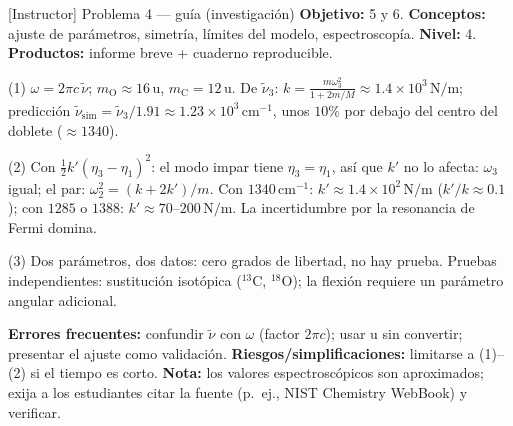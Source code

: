\documentclass[spanish,10pt]{beamer}
\begin{document}
\begin{frame}{[Instructor] Problema 4 — guía (investigación)}
\footnotesize
\textbf{Objetivo:} 5 y 6. \textbf{Conceptos:} ajuste de parámetros, simetría, límites del modelo, espectroscopía. \textbf{Nivel:} 4. \textbf{Productos:} informe breve + cuaderno reproducible.

(1) $\omega=2\pi c\,\tilde\nu$; $m_{\mathrm O}\approx16\,$u, $m_{\mathrm C}=12\,$u. De $\tilde\nu_3$: $k=\frac{m\omega_3^2}{1+2m/M}\approx1.4\times10^3\,\mathrm{N/m}$; predicción $\tilde\nu_{\mathrm{sim}}=\tilde\nu_3/1.91\approx1.23\times10^3\,\mathrm{cm}^{-1}$, unos $10\%$ por debajo del centro del doblete ($\approx1340$).

(2) Con $\frac12k'(\eta_3-\eta_1)^2$: el modo impar tiene $\eta_3=\eta_1$, así que $k'$ no lo afecta: $\omega_3$ igual; el par: $\omega_2^2=(k+2k')/m$. Con $1340\,\mathrm{cm}^{-1}$: $k'\approx1.4\times10^2\,\mathrm{N/m}$ ($k'/k\approx0.1$); con $1285$ o $1388$: $k'\approx70$–$200\,\mathrm{N/m}$. La incertidumbre por la resonancia de Fermi domina.

(3) Dos parámetros, dos datos: cero grados de libertad, no hay prueba. Pruebas independientes: sustitución isotópica ($^{13}$C, $^{18}$O); la flexión requiere un parámetro angular adicional.

\textbf{Errores frecuentes:} confundir $\tilde\nu$ con $\omega$ (factor $2\pi c$); usar u sin convertir; presentar el ajuste como validación. \textbf{Riesgos/simplificaciones:} limitarse a (1)–(2) si el tiempo es corto. \textbf{Nota:} los valores espectroscópicos son aproximados; exija a los estudiantes citar la fuente (p.~ej., NIST Chemistry WebBook) y verificar.
\end{frame}
\end{document}
